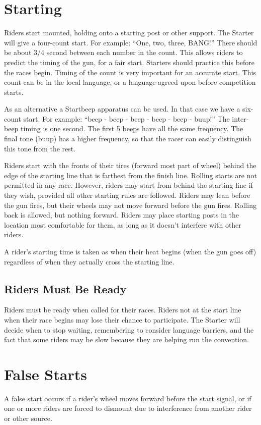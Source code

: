 \section{Starting}
Riders start mounted, holding onto a starting post or other support.
The Starter will give a four-count start.
For example: ``One, two, three, BANG!'' There should be about 3/4 second between each number in the count.
This allows riders to predict the timing of the gun, for a fair start.
Starters should practice this before the races begin.
Timing of the count is very important for an accurate start.
This count can be in the local language, or a language agreed upon before competition starts.

As an alternative a Startbeep apparatus can be used.
In that case we have a six-count start.
For example: ``beep - beep - beep - beep - beep - buup!'' The inter-beep timing is one second.
The first 5 beeps have all the same frequency.
The final tone (buup) has a higher frequency, so that the racer can easily distinguish this tone from the rest.

Riders start with the fronts of their tires (forward most part of wheel) behind the edge of the starting line that is farthest from the finish line.
Rolling starts are not permitted in any race.
However, riders may start from behind the starting line if they wish, provided all other starting rules are followed.
Riders may lean before the gun fires, but their wheels may not move forward before the gun fires.
Rolling back is allowed, but nothing forward.
Riders may place starting posts in the location most comfortable for them, as long as it doesn't interfere with other riders.

A rider’s starting time is taken as when their heat begins (when the gun goes off) regardless of when they actually cross the starting line.
\subsection{Riders Must Be Ready}
Riders must be ready when called for their races.
Riders not at the start line when their race begins may lose their chance to participate.
The Starter will decide when to stop waiting, remembering to consider language barriers, and the fact that some riders may be slow because they are helping run the convention.

\section{False Starts}
A false start occurs if a rider's wheel moves forward before the start signal, or if one or more riders are forced to dismount due to interference from another rider or other source.

